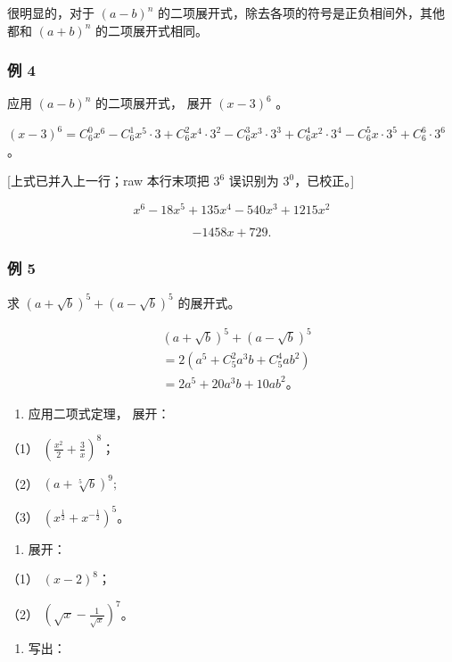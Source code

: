 很明显的，对于 \((a - b)^n\)
的二项展开式，除去各项的符号是正负相间外，其他都和 \((a + b)^n\)
的二项展开式相同。

\subsubsection{例 4}

应用 \((a-b)^{n}\) 的二项展开式， 展开 \((x-3)^{6}\) 。

\((x-3)^6=C_6^0x^6-C_6^1x^5\cdot3+C_6^2x^4\cdot3^2-C_6^3x^3\cdot3^3+C_6^4x^2\cdot3^4-C_6^5x\cdot3^5+C_6^6\cdot3^6\)。

{[}上式已并入上一行；raw 本行末项把 \(3^6\) 误识别为
\(3^0\)，已校正。{]}

\[
x^6-18x^5+135x^4-540x^3+1215x^2
\]

\[
- 1458 x + 729.
\]

\subsubsection{例 5}

求 \((a + \sqrt{b})^5 + (a - \sqrt{b})^5\) 的展开式。


\[
\begin{aligned}
&(a+\sqrt b)^5+(a-\sqrt b)^5\\
&=2\left(a^5+C_5^2a^3b+C_5^4ab^2\right)\\
&=2a^5+20a^3b+10ab^2\text{。}
\end{aligned}
\]

\begin{enumerate}
\item
  应用二项式定理， 展开：
\end{enumerate}

（1） \(\left(\frac{x^2}{2} + \frac{3}{x}\right)^8\)；

（2） \((a + \sqrt[5]{b})^9;\)

（3） \((x^{\frac{1}{2}} + x^{-\frac{1}{2}})^{5}\)。

\begin{enumerate}[start=2]
\item
  展开：
\end{enumerate}

（1） \((x - 2)^{8}\)；

（2） \(\left(\sqrt{x} - \frac{1}{\sqrt{x}}\right)^7\)。

\begin{enumerate}[start=3]
\item
  写出：
\end{enumerate}

